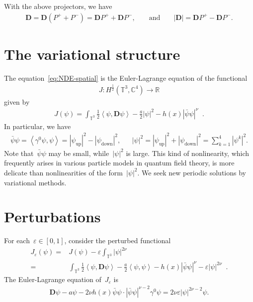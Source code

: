 \documentclass[11pt,final]{amsart}
\newcommand{\Abracket}[1]{\left<#1\right>} %
\newcommand{\R}{\mathbb{R}}
\newcommand{\C}{\mathbb{C}}
\newcommand{\T}{\mathbb{T}}
\newcommand{\dd}{\mathop{}\!\mathrm{d}}
\newcommand{\eps}{\varepsilon}
\newcommand{\pD}{\mathbf{D}}
\DeclareMathOperator{\dv}{\dd{vol}}
\DeclareMathOperator{\up}{up}
\DeclareMathOperator{\low}{down}
\begin{document}
With the above projectors, we have
\begin{align}
    \pD = \pD(P^+ + P^-) = \pD P^+ + \pD P^-, & &\mbox{ and }& &
    |\pD|= \pD P^+ - \pD P^-.
\end{align}



\section{The variational structure}\label{sect:variational str}

The equation~\eqref{eq:NDE-spatial} is the Euler-Lagrange equation of the functional
\begin{align}
    J\colon H^{\frac{1}{2}}(\T^3,\C^4)\to \R
\end{align}
given by
\begin{align}
    J(\psi)
    =\int_{\T^3}  \frac{1}{2}\Abracket{\psi,\pD\psi} -\frac{a}{2}|\psi|^2 - h(x)|\bar{\psi}\psi|^\nu\dv.
\end{align}
In particular, we have
\begin{align}
    \bar{\psi}\psi = \Abracket{\gamma^0\psi,\psi}= |\psi_{\up}|^2 - |\psi_{\low}|^2, & &
    |\psi|^2 = |\psi_{\up}|^2 + |\psi_{\low}|^2 = \sum_{k=1}^4 |\psi^k|^2.
\end{align}
Note that~$\bar{\psi}\psi$ may be small, while~$|\psi|^2$ is large.
This kind of nonlinearity, which frequently arises in various particle models in quantum field theory, is more delicate than nonlinearities of the form~$|\psi|^2$. We seek new periodic solutions by variational methods.






\section{Perturbations}\label{sect:perturbation}

For each~$\eps\in [0,1]$, consider the perturbed functional
\begin{align}
    J_\eps(\psi)
    =& J(\psi)-\eps\int_{\T^3} |\psi|^{2\nu}\dv \\
    =& \int_{\T^3} \frac{1}{2}\Abracket{\psi,\pD\psi}-\frac{a}{2}\Abracket{\psi,\psi}- h(x)|\bar{\psi}\psi|^\nu-\eps|\psi|^{2\nu}\dv.
\end{align}
The Euler-Lagrange equation of~$J_\eps$ is
\begin{align}\label{eq:perturbative Dirac eq}
    \pD\psi -a\psi -2\nu h(x)\bar{\psi}\psi\cdot|\bar{\psi}\psi|^{\nu-2}\gamma^0\psi= 2\nu\eps|\psi|^{2\nu-2}\psi.
\end{align}
\end{document}
